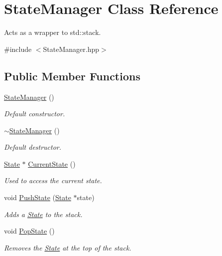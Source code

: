 \hypertarget{class_state_manager}{}\section{State\+Manager Class Reference}
\label{class_state_manager}


Acts as a wrapper to std\+::stack.  




{\ttfamily \#include $<$State\+Manager.\+hpp$>$}

\subsection*{Public Member Functions}
\begin{DoxyCompactItemize}
\item 
\mbox{\label{class_state_manager_a3e2be96d935eb56813b096a885d58587}} 
\mbox{\hyperlink{class_state_manager_a3e2be96d935eb56813b096a885d58587}{State\+Manager}} ()
\begin{DoxyCompactList}\small\item\em Default constructor. \end{DoxyCompactList}\item 
\mbox{\label{class_state_manager_a05a43504a033f1befad5c5118249ec6f}} 
\mbox{\hyperlink{class_state_manager_a05a43504a033f1befad5c5118249ec6f}{$\sim$\+State\+Manager}} ()
\begin{DoxyCompactList}\small\item\em Default destructor. \end{DoxyCompactList}\item 
\mbox{\hyperlink{class_state}{State}} $\ast$ \mbox{\hyperlink{class_state_manager_a76446362726ceb518445e2bdd4814be4}{Current\+State}} ()
\begin{DoxyCompactList}\small\item\em Used to access the current state. \end{DoxyCompactList}\item 
void \mbox{\hyperlink{class_state_manager_a7c6248e6e74dc09736dcc0ed5a622177}{Push\+State}} (\mbox{\hyperlink{class_state}{State}} $\ast$state)
\begin{DoxyCompactList}\small\item\em Adds a \mbox{\hyperlink{class_state}{State}} to the stack. \end{DoxyCompactList}\item 
\mbox{\label{class_state_manager_a01cd6f5dafc0add0633b0be231cce665}} 
void \mbox{\hyperlink{class_state_manager_a01cd6f5dafc0add0633b0be231cce665}{Pop\+State}} ()
\begin{DoxyCompactList}\small\item\em Removes the \mbox{\hyperlink{class_state}{State}} at the top of the stack. \end{DoxyCompactList}\end{DoxyCompactItemize}


